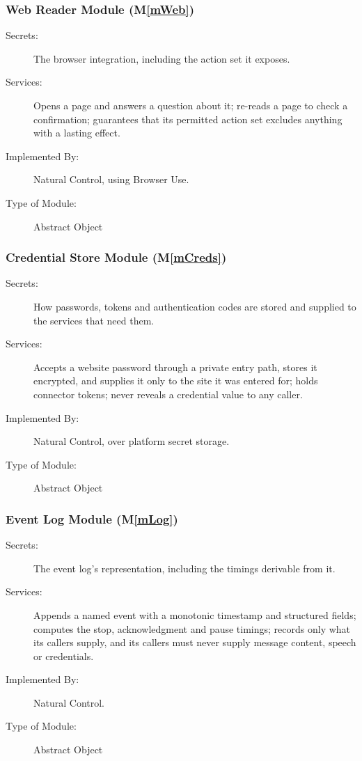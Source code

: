 \documentclass[12pt, titlepage]{article}
\newcommand{\progname}{Natural Control}
\newcommand{\mref}[1]{M\ref{#1}}
\begin{document}
\subsubsection{Web Reader Module (\mref{mWeb})}
\begin{description}
\item[Secrets:] The browser integration, including the action set it
exposes.
\item[Services:] Opens a page and answers a question about it; re-reads a page
to check a confirmation; guarantees that its permitted action set excludes
anything with a lasting effect.
\item[Implemented By:] \progname{}, using Browser Use.
\item[Type of Module:] Abstract Object
\end{description}

\subsubsection{Credential Store Module (\mref{mCreds})}
\begin{description}
\item[Secrets:] How passwords, tokens and authentication codes are stored and
supplied to the services that need them.
\item[Services:] Accepts a website password through a private entry path,
stores it encrypted, and supplies it only to the site it was entered for;
holds connector tokens; never reveals a credential value to any caller.
\item[Implemented By:] \progname{}, over platform secret storage.
\item[Type of Module:] Abstract Object
\end{description}

\subsubsection{Event Log Module (\mref{mLog})}
\begin{description}
\item[Secrets:] The event log's representation, including the timings
derivable from it.
\item[Services:] Appends a named event with a monotonic timestamp and
structured fields; computes the stop, acknowledgment and pause timings;
records only what its callers supply, and its callers must never supply message
content, speech or credentials.
\item[Implemented By:] \progname{}.
\item[Type of Module:] Abstract Object
\end{description}
\end{document}
